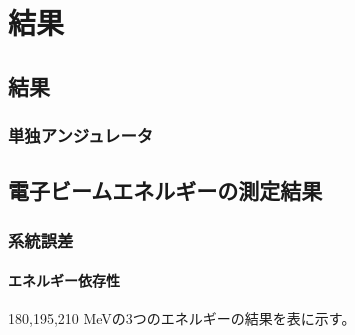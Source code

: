 \documentclass[a4paper,11pt,uplatex]{jsbook}
\begin{document}
\chapter{結果}
\section{結果}

\subsection{単独アンジュレータ}

\section{電子ビームエネルギーの測定結果}
\subsection{系統誤差}

\subsubsection{エネルギー依存性}
180,195,210 MeVの3つのエネルギーの結果を表に示す。
\end{document}
